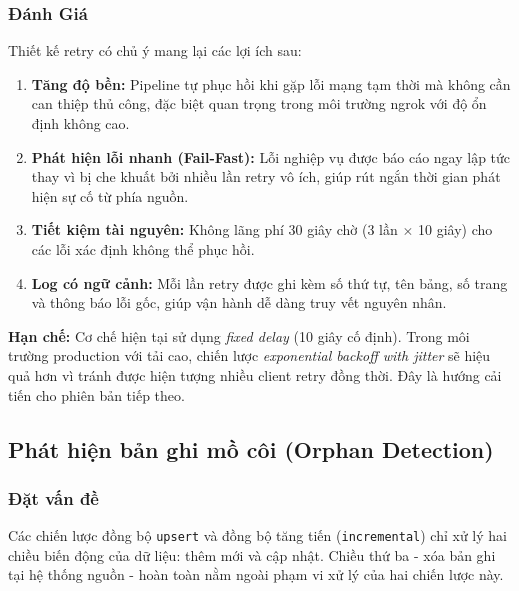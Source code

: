 \subsubsection{Đánh Giá}

Thiết kế retry có chủ ý mang lại các lợi ích sau:

\begin{enumerate}
    \item \textbf{Tăng độ bền:} Pipeline tự phục hồi khi gặp lỗi
    mạng tạm thời mà không cần can thiệp thủ công, đặc biệt quan trọng trong
    môi trường ngrok với độ ổn định không cao.

    \item \textbf{Phát hiện lỗi nhanh (Fail-Fast):} Lỗi nghiệp vụ được báo cáo
    ngay lập tức thay vì bị che khuất bởi nhiều lần retry vô ích, giúp rút ngắn
    thời gian phát hiện sự cố từ phía nguồn.

    \item \textbf{Tiết kiệm tài nguyên:} Không lãng phí 30 giây chờ (3 lần
    $\times$ 10 giây) cho các lỗi xác định không thể phục hồi.

    \item \textbf{Log có ngữ cảnh:} Mỗi lần retry được ghi kèm số thứ tự, tên
    bảng, số trang và thông báo lỗi gốc, giúp vận hành dễ dàng truy vết nguyên
    nhân.
\end{enumerate}

\textbf{Hạn chế:} Cơ chế hiện tại sử dụng \textit{fixed delay} (10 giây cố
định). Trong môi trường production với tải cao, chiến lược
\textit{exponential backoff with jitter} sẽ hiệu quả hơn vì tránh được hiện
tượng nhiều client retry đồng thời. Đây là
hướng cải tiến cho phiên bản tiếp theo.

\newpage

\subsection{Phát hiện bản ghi mồ côi (Orphan Detection)}

\subsubsection{Đặt vấn đề}

Các chiến lược đồng bộ \texttt{upsert} và đồng bộ tăng tiến (\texttt{incremental}) chỉ xử lý hai chiều biến động của dữ liệu: thêm mới và cập nhật. Chiều thứ ba - xóa bản ghi tại hệ thống nguồn - hoàn toàn nằm ngoài phạm vi xử lý của hai chiến lược này.

